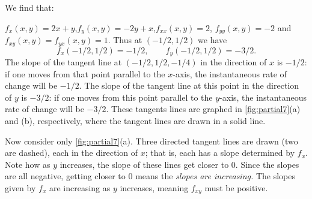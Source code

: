 {We find that:

$f_x(x,y) = 2x+y$,\quad  $f_y(x,y) = -2y+x$,\quad $f_{xx}(x,y) = 2$, \quad $f_{yy}(x,y) = -2$ and $f_{xy}(x,y) = f_{yx}(x,y) = 1$. Thus at $(-1/2,1/2)$ we have 
$$f_x(-1/2,1/2) = -1/2,\qquad f_y(-1/2,1/2) = -3/2.$$
The slope of the tangent line at $(-1/2, 1/2, -1/4)$ in the direction of $x$ is $-1/2$: if one moves from that point parallel to the $x$-axis, the instantaneous rate of change will be $-1/2$. The slope of the tangent line
 at this point in the direction of $y$ is $-3/2$: if one moves from this point parallel to the $y$-axis, the instantaneous rate of change will be $-3/2$. These tangents lines are graphed in \autoref{fig:partial7}(a) and (b), respectively, where the tangent lines are drawn in a solid line. 

Now consider only \autoref{fig:partial7}(a). Three directed tangent lines are drawn (two are dashed), each in the direction of $x$; that is, each has a slope determined by $f_x$. Note how as $y$ increases, the slope of these lines get closer to $0$. Since the slopes are all negative, getting closer to 0 means the \textit{slopes are increasing.} The slopes given by $f_x$ are increasing as $y$ increases, meaning $f_{xy}$ must be positive. 

}

